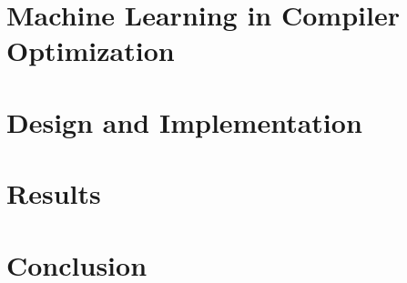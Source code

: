 \documentclass[msthesis,justified,copyright,final,numbers,sort&compress,
gsmodern,amstex,natbib]{uothesis}
\begin{document}
\chapter{Machine Learning in Compiler Optimization}
\label{learning}


\chapter{Design and Implementation}
\label{design}


\chapter{Results}
\label{results}


\chapter{Conclusion}
\label{conclusion}

\appendix
%



\end{document}
